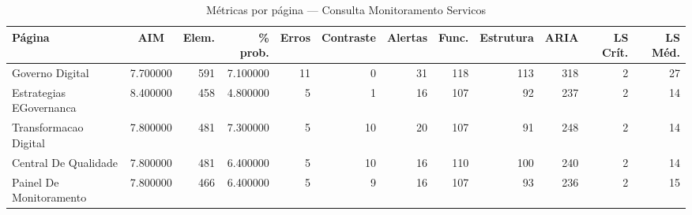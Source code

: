 \begin{table}[htbp]
  \centering
  \caption{Métricas por página — Consulta Monitoramento Servicos}
  \label{tab:flow_consulta_monitoramento_servicos}
  \small
  \begin{tabular}{lcrrrrrrrrrr}
\toprule
Página & AIM & Elem. & \% prob. & Erros & Contraste & Alertas & Func. & Estrutura & ARIA & LS Crít. & LS Méd. \\
\midrule
Governo Digital & 7.700000 & 591 & 7.100000 & 11 & 0 & 31 & 118 & 113 & 318 & 2 & 27 \\
Estrategias EGovernanca & 8.400000 & 458 & 4.800000 & 5 & 1 & 16 & 107 & 92 & 237 & 2 & 14 \\
Transformacao Digital & 7.800000 & 481 & 7.300000 & 5 & 10 & 20 & 107 & 91 & 248 & 2 & 14 \\
Central De Qualidade & 7.800000 & 481 & 6.400000 & 5 & 10 & 16 & 110 & 100 & 240 & 2 & 14 \\
Painel De Monitoramento & 7.800000 & 466 & 6.400000 & 5 & 9 & 16 & 107 & 93 & 236 & 2 & 15 \\
\bottomrule
\end{tabular}
\end{table}
